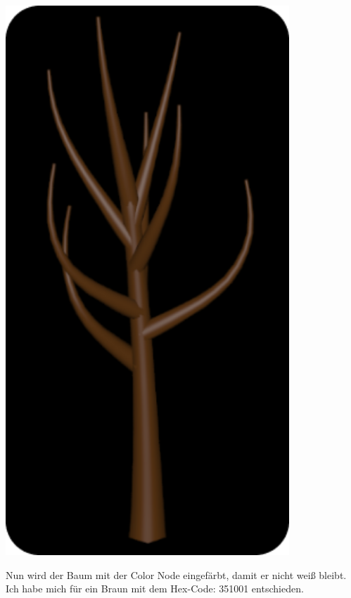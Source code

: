 \documentclass[paper=a4,fontsize=12pt,ngerman]{scrartcl}
\begin{document}
	\begin{minipage}{0.3\textwidth}
	\includegraphics[width=0.8\textwidth]{graphics/Ali5.png}
	\end{minipage}
	\begin{minipage}{0.7\textwidth}
	Nun wird der Baum mit der Color Node eingefärbt, damit er nicht weiß bleibt. Ich habe mich für ein Braun mit dem Hex-Code: 351001 entschieden.
	\end{minipage}
\end{document}
